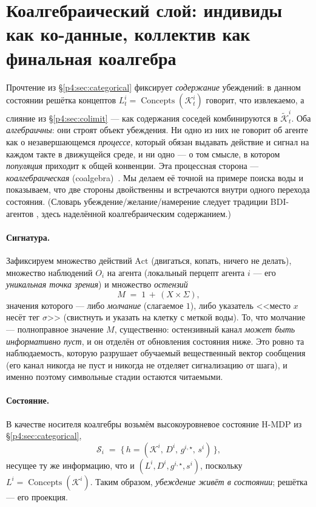 \documentclass{article}
\begin{document}
\section{Коалгебраический слой: индивиды как ко-данные, коллектив как финальная коалгебра}
\label{p4:sec:coalgebra}

Прочтение из \S\ref{p4:sec:categorical} фиксирует \emph{содержание}
убеждений: в данном состоянии решётка концептов
$L_t^i=\operatorname{Concepts}(\mathcal{K}_t^i)$ говорит, что извлекаемо,
а слияние из \S\ref{p4:sec:colimit} --- как содержания соседей комбинируются
в $\widetilde{\mathcal K}_t^i$. Оба \emph{алгебраичны}: они строят объект
убеждения. Ни одно из них не говорит об агенте как о незавершающемся
\emph{процессе}, который обязан выдавать действие и сигнал на каждом
такте в движущейся среде, и ни одно --- о том смысле, в котором
\emph{популяция} приходит к общей конвенции. Эта процессная сторона ---
\emph{коалгебраическая} (coalgebra)~\citep{rutten2000universal,jacobs2016coalgebra}.
Мы делаем её точной на примере поиска воды и показываем, что две стороны
двойственны и встречаются внутри одного перехода состояния. (Словарь
убеждение/желание/намерение следует традиции BDI-агентов
\citep{rao1995bdi}, здесь наделённой коалгебраическим содержанием.)

\paragraph{Сигнатура.} Зафиксируем множество действий $\mathrm{Act}$
(двигаться, копать, ничего не делать), множество наблюдений $O_i$ на
агента (локальный перцепт агента $i$ --- его \emph{уникальная точка
зрения}) и множество \emph{остензий}
\[
  M \;=\; 1 \,+\, (X\times\Sigma),
\]
значения которого --- либо \emph{молчание} (слагаемое $1$), либо
указатель <<место $x$ несёт тег $\sigma$>> (свистнуть и указать на
клетку с меткой воды). То, что молчание --- полноправное значение $M$,
существенно: остензивный канал \emph{может быть информативно пуст}, и он
отделён от обновления состояния ниже. Это ровно та наблюдаемость,
которую разрушает обучаемый вещественный вектор сообщения (его канал
никогда не пуст и никогда не отделяет сигнализацию от шага), и именно
поэтому символьные стадии остаются читаемыми.

\paragraph{Состояние.} В качестве носителя коалгебры возьмём
высокоуровневое состояние H-MDP из \S\ref{p4:sec:categorical},
\[
  \mathcal{S}_i \;=\; \big\{\, h=(\mathcal{K}^i,\,D^i,\,g^{i,\star},\,s^i) \,\big\},
\]
несущее ту же информацию, что и $(L^i,D^i,g^{i,\star},s^i)$, поскольку
$L^i=\operatorname{Concepts}(\mathcal K^i)$. Таким образом,
\emph{убеждение живёт в состоянии}; решётка --- его проекция.
\end{document}
